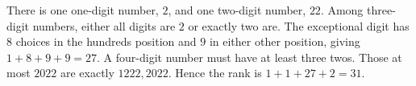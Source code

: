 There is one one-digit number, $ 2 $, and one two-digit number, $ 22 $. Among three-digit numbers, either all digits are $ 2 $ or exactly two are. The exceptional digit has $ 8 $ choices in the hundreds position and $ 9 $ in either other position, giving $ 1+8+9+9=27 $. A four-digit number must have at least three twos. Those at most $ 2022 $ are exactly $ 1222,2022 $. Hence the rank is $ 1+1+27+2=\boxed{31}$.
